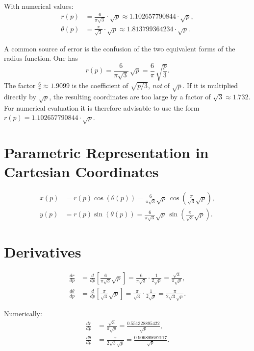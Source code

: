 With numerical values:
\begin{align}
r(p) &= \frac{6}{\pi\sqrt{3}} \cdot \sqrt{p} \approx 1.102657790844 \cdot \sqrt{p}, \\
\theta(p) &= \frac{\pi}{\sqrt{3}} \cdot \sqrt{p} \approx 1.813799364234 \cdot \sqrt{p}.
\end{align}

\begin{note}
A common source of error is the confusion of the two equivalent forms
of the radius function. One has
\[
  r(p) = \frac{6}{\pi\sqrt{3}}\,\sqrt{p}
       = \frac{6}{\pi}\,\sqrt{\frac{p}{3}}.
\]
The factor $\frac{6}{\pi} \approx 1.9099$ is the coefficient of $\sqrt{p/3}$, \emph{not} 
of $\sqrt{p}$. If it is multiplied directly by $\sqrt{p}$, the resulting 
coordinates are too large by a factor of $\sqrt{3} \approx 1.732$. 
For numerical evaluation it is therefore advisable to use the form 
$r(p) = 1.102657790844 \cdot \sqrt{p}$.
\end{note}

\section{Parametric Representation in Cartesian Coordinates}

\begin{equation}
\begin{aligned}
x(p) &= r(p)\cos(\theta(p))
     = \frac{6}{\pi\sqrt{3}}\sqrt{p}\,
       \cos\!\left(\frac{\pi}{\sqrt{3}}\sqrt{p}\right), \\[6pt]
y(p) &= r(p)\sin(\theta(p))
     = \frac{6}{\pi\sqrt{3}}\sqrt{p}\,
       \sin\!\left(\frac{\pi}{\sqrt{3}}\sqrt{p}\right).
\end{aligned}
\end{equation}

\section{Derivatives}

\begin{theorem}
\begin{equation}
\begin{aligned}
\frac{dr}{dp}
  &= \frac{d}{dp}\left[\frac{6}{\pi\sqrt{3}}\sqrt{p}\right]
   = \frac{6}{\pi\sqrt{3}} \cdot \frac{1}{2\sqrt{p}}
   = \frac{\sqrt{3}}{\pi\sqrt{p}}, \\[10pt]
\frac{d\theta}{dp}
  &= \frac{d}{dp}\left[\frac{\pi}{\sqrt{3}}\sqrt{p}\right]
   = \frac{\pi}{\sqrt{3}} \cdot \frac{1}{2\sqrt{p}}
   = \frac{\pi}{2\sqrt{3}\sqrt{p}}.
\end{aligned}
\end{equation}
\end{theorem}

Numerically:
\begin{align}
\frac{dr}{dp} &= \frac{\sqrt{3}}{\pi\sqrt{p}} = \frac{0.551328895422}{\sqrt{p}}, \\[4pt]
\frac{d\theta}{dp} &= \frac{\pi}{2\sqrt{3}\sqrt{p}} = \frac{0.906899682117}{\sqrt{p}}.
\end{align}
